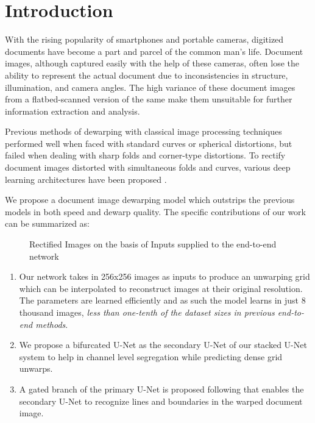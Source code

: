 \documentclass[a4paper,conference]{IEEEtran}
\begin{document}
	
	\IEEEpeerreviewmaketitle
	
	
	\section{Introduction}
	With the rising popularity of smartphones and portable cameras, digitized documents have become a part and parcel of the common man's life. Document images, although captured easily with the help of these cameras, often lose the ability to represent the actual document due to inconsistencies in structure, illumination, and camera angles. The high variance of these document images from a flatbed-scanned version of the same make them unsuitable for further information extraction and analysis.
	
	
	Previous methods of dewarping with classical image processing techniques performed well when faced with standard curves or spherical distortions, but failed  when dealing with sharp folds and corner-type distortions. To rectify document images distorted with simultaneous folds and curves, various deep learning architectures have been proposed \cite{Ma-CVPR18,das2019dewarpnet}.
	
	
	We propose a document image dewarping model which outstrips the previous models in both speed and dewarp quality. The specific contributions of our work can be summarized as:
	
	\begin{figure}
		\centering
		
		\caption{Rectified Images on the basis of Inputs supplied to the end-to-end network}
	\end{figure}
	
	\begin{enumerate}
		\item Our network takes in 256x256 images as inputs to produce an unwarping grid which can be interpolated to reconstruct images at their original resolution. The parameters are learned efficiently and as such the model learns in just 8 thousand images, \emph{less than one-tenth of the dataset sizes in previous end-to-end methods}.
		
		\item We propose a bifurcated U-Net as the secondary U-Net of our stacked U-Net system to  help in channel level segregation while predicting dense grid unwarps.
		
		\item A gated branch of the primary U-Net is proposed following \cite{GSCNN} that	enables the secondary U-Net to recognize lines and boundaries in the warped document image.
		
	\end{enumerate} 
	
\end{document}

